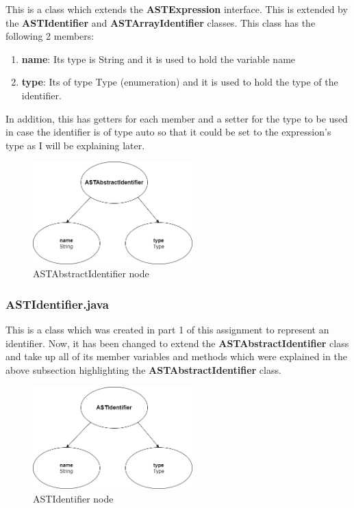 \documentclass{article}
\begin{document}
					This is a class which extends the \textbf{ASTExpression} interface. This is extended by the \textbf{ASTIdentifier} and \textbf{ASTArrayIdentifier} classes. This class has the following 2 members: 
					\begin{enumerate}
					\item \textbf{name}: Its type is String and it is used to hold the variable name
					\item \textbf{type}: Its of type Type (enumeration) and it is used to hold the type of the identifier.
				
					\end{enumerate}
			In addition, this has getters for each member and a setter for the type to be used in case the identifier is of type auto so that it could be set to the expression's type as I will be explaining later.
			
			\begin{figure}[H]
					\centering
			 			\includegraphics[width=0.55\textwidth]{astabstractid.png}
			  			\caption{ASTAbstractIdentifier node}
			  			\label{fig:astabstractid}
					\end{figure}
	
					
					
		\subsubsection{ASTIdentifier.java}
					
					This is a class which was created in part 1 of this assignment to represent an identifier. Now, it has been changed to extend the \textbf{ASTAbstractIdentifier} class and take up all of its member variables and methods which were explained in the above subsection highlighting the \textbf{ASTAbstractIdentifier} class.
					
					\begin{figure}[H]
					\centering
			 			\includegraphics[width=0.55\textwidth]{astidentifier.png}
			  			\caption{ASTIdentifier node}
			  			\label{fig:astidentifier}
					\end{figure}
					
\end{document}
